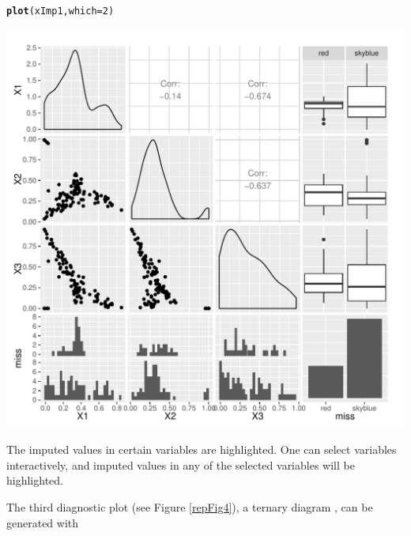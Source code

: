 \documentclass{scrartcl}\usepackage[]{graphicx}\usepackage[]{color}
\makeatletter
\def\maxwidth{ %
  \ifdim\Gin@nat@width>\linewidth
    \linewidth
  \else
    \Gin@nat@width
  \fi
}
\newcommand{\hlnum}[1]{\textcolor[rgb]{0.686,0.059,0.569}{#1}}%
\newcommand{\hlstd}[1]{\textcolor[rgb]{0.345,0.345,0.345}{#1}}%
\newcommand{\hlkwc}[1]{\textcolor[rgb]{0.333,0.667,0.333}{#1}}%
\newcommand{\hlkwd}[1]{\textcolor[rgb]{0.737,0.353,0.396}{\textbf{#1}}}%
\newenvironment{kframe}{%
 \def\at@end@of@kframe{}%
 \ifinner\ifhmode%
  \def\at@end@of@kframe{\end{minipage}}%
  \begin{minipage}{\columnwidth}%
 \fi\fi%
 \def\FrameCommand##1{\hskip\@totalleftmargin \hskip-\fboxsep
 \colorbox{shadecolor}{##1}\hskip-\fboxsep
     \hskip-\linewidth \hskip-\@totalleftmargin \hskip\columnwidth}%
 \MakeFramed {\advance\hsize-\width
   \@totalleftmargin\z@ \linewidth\hsize
   \@setminipage}}%
 {\par\unskip\endMakeFramed%
 \at@end@of@kframe}
\newenvironment{knitrout}{}{} %
\makeatother
\begin{document}
\begin{knitrout}
\color{fgcolor}\begin{kframe}
\begin{alltt}
\hlkwd{plot}\hlstd{(xImp1,} \hlkwc{which}\hlstd{=}\hlnum{2}\hlstd{)}
\end{alltt}
\end{kframe}
\includegraphics[width=\maxwidth]{figure/unnamed-chunk-4-1} 

\end{knitrout}
The imputed values in certain variables are highlighted.
One can select variables interactively, and imputed values in any of the 
 selected variables will be highlighted. 


The third diagnostic plot (see Figure \ref{repFig4}), a ternary diagram \citep{Aitchison86},
 can be generated with 
 
\end{document}
